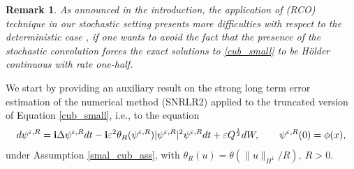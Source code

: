 \documentclass[a4paper]{amsart}
\newtheorem{remark}{Remark}[section]
\begin{document}
        \begin{remark}
            As announced in the introduction, the application of (RCO) technique in our stochastic setting presents more difficulties with respect to the deterministic case \cite{fe_ka}, if one wants to avoid the fact that the presence of the stochastic convolution forces the exact solutions to \eqref{cub_small} to be Hölder continuous with rate one-half.
        \end{remark}
We start by providing an auxiliary result on the strong long term error estimation of the numerical method (SNRLR2) applied to the truncated version of Equation \eqref{cub_small}, i.e., to the equation
\begin{equation}
    \label{trunc_cub2}
 d\psi^{\varepsilon,R}={\bf i}\Delta \psi^{\varepsilon,R} dt-{\bf i}\varepsilon^2 \theta_R(\psi^{\varepsilon,R})|\psi^{\varepsilon,R}|^2\psi^{\varepsilon,R} dt+\varepsilon Q^{\frac{1}{2}}dW, \qquad \psi^{\varepsilon,R}(0)=\phi(x),
\end{equation}
under Assumption \ref{smal_cub_ass}, with $\theta_R(u)=\theta(\|u\|_{H^1}/R), \ R>0$.
\end{document}
